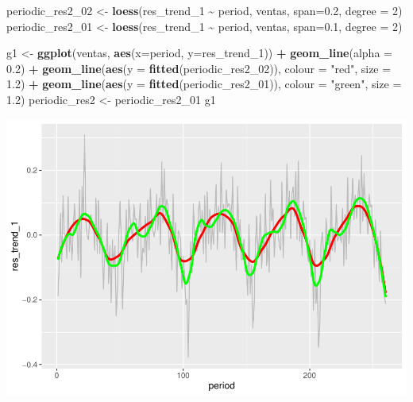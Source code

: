 \documentclass[
]{article}
\newenvironment{Shaded}{\begin{snugshade}}{\end{snugshade}}
\newcommand{\AttributeTok}[1]{\textcolor[rgb]{0.13,0.29,0.53}{#1}}
\newcommand{\DecValTok}[1]{\textcolor[rgb]{0.00,0.00,0.81}{#1}}
\newcommand{\FloatTok}[1]{\textcolor[rgb]{0.00,0.00,0.81}{#1}}
\newcommand{\FunctionTok}[1]{\textcolor[rgb]{0.13,0.29,0.53}{\textbf{#1}}}
\newcommand{\NormalTok}[1]{#1}
\newcommand{\OtherTok}[1]{\textcolor[rgb]{0.56,0.35,0.01}{#1}}
\newcommand{\SpecialCharTok}[1]{\textcolor[rgb]{0.81,0.36,0.00}{\textbf{#1}}}
\newcommand{\StringTok}[1]{\textcolor[rgb]{0.31,0.60,0.02}{#1}}
\begin{document}
\begin{Shaded}
\begin{Highlighting}[]
\NormalTok{periodic\_res2\_02 }\OtherTok{\textless{}{-}} \FunctionTok{loess}\NormalTok{(res\_trend\_1 }\SpecialCharTok{\textasciitilde{}}\NormalTok{ period, ventas, }\AttributeTok{span=}\FloatTok{0.2}\NormalTok{, }\AttributeTok{degree =} \DecValTok{2}\NormalTok{)}
\NormalTok{periodic\_res2\_01 }\OtherTok{\textless{}{-}} \FunctionTok{loess}\NormalTok{(res\_trend\_1 }\SpecialCharTok{\textasciitilde{}}\NormalTok{ period, ventas, }\AttributeTok{span=}\FloatTok{0.1}\NormalTok{, }\AttributeTok{degree =} \DecValTok{2}\NormalTok{)}

\NormalTok{g1 }\OtherTok{\textless{}{-}} \FunctionTok{ggplot}\NormalTok{(ventas, }\FunctionTok{aes}\NormalTok{(}\AttributeTok{x=}\NormalTok{period, }\AttributeTok{y=}\NormalTok{res\_trend\_1)) }\SpecialCharTok{+}
  \FunctionTok{geom\_line}\NormalTok{(}\AttributeTok{alpha =} \FloatTok{0.2}\NormalTok{) }\SpecialCharTok{+}
  \FunctionTok{geom\_line}\NormalTok{(}\FunctionTok{aes}\NormalTok{(}\AttributeTok{y =} \FunctionTok{fitted}\NormalTok{(periodic\_res2\_02)), }\AttributeTok{colour =} \StringTok{"red"}\NormalTok{, }\AttributeTok{size =} \FloatTok{1.2}\NormalTok{) }\SpecialCharTok{+}
  \FunctionTok{geom\_line}\NormalTok{(}\FunctionTok{aes}\NormalTok{(}\AttributeTok{y =} \FunctionTok{fitted}\NormalTok{(periodic\_res2\_01)), }\AttributeTok{colour =} \StringTok{"green"}\NormalTok{, }\AttributeTok{size =} \FloatTok{1.2}\NormalTok{) }
\NormalTok{periodic\_res2 }\OtherTok{\textless{}{-}}\NormalTok{ periodic\_res2\_01}
\NormalTok{g1}
\end{Highlighting}
\end{Shaded}

\includegraphics{tarea-eda-2_files/figure-latex/unnamed-chunk-5-1.pdf}
\end{document}
